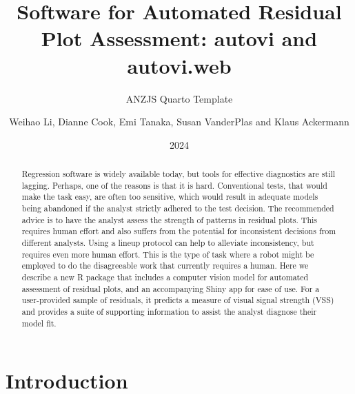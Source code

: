 \documentclass[
doublespace,
  times]{anzsauth}
\title{Software for Automated Residual Plot Assessment: autovi and
autovi.web}
\subtitle{ANZJS Quarto Template}
\author{
Weihao Li\addressnum{1},
Dianne Cook\addressnum{1},
Emi Tanaka\addressnum{2},
Susan VanderPlas\addressnum{3} and
Klaus Ackermann
\addressnum{1}
}
\affiliation{
Monash University,
The Australian National University and
University of Nebraska
}
\date{2024}
\begin{document}
\begin{abstract}
Regression software is widely available today, but tools for effective
diagnostics are still lagging. Perhaps, one of the reasons is that it is
hard. Conventional tests, that would make the task easy, are often too
sensitive, which would result in adequate models being abandoned if the
analyst strictly adhered to the test decision. The recommended advice is
to have the analyst assess the strength of patterns in residual plots.
This requires human effort and also suffers from the potential for
inconsistent decisions from different analysts. Using a lineup protocol
can help to alleviate inconsistency, but requires even more human
effort. This is the type of task where a robot might be employed to do
the disagreeable work that currently requires a human. Here we describe
a new R package that includes a computer vision model for automated
assessment of residual plots, and an accompanying Shiny app for ease of
use. For a user-provided sample of residuals, it predicts a measure of
visual signal strength (VSS) and provides a suite of supporting
information to assist the analyst diagnose their model fit.
\end{abstract}

          

\maketitle


\section{Introduction}\label{sec-autovi-introduction}
\end{document}
